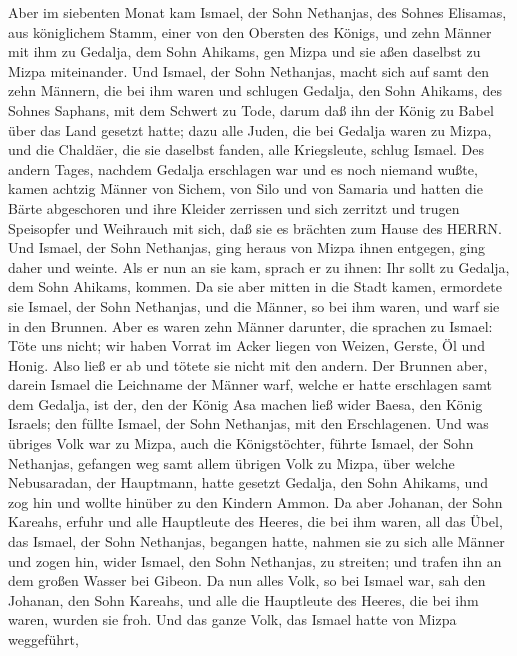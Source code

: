  Aber im siebenten Monat kam Ismael, der Sohn Nethanjas, des
Sohnes Elisamas, aus königlichem Stamm, einer von den Obersten des
Königs, und zehn Männer mit ihm zu Gedalja, dem Sohn Ahikams, gen Mizpa
und sie aßen daselbst zu Mizpa miteinander.  Und Ismael, der
Sohn Nethanjas, macht sich auf samt den zehn Männern, die bei ihm waren
und schlugen Gedalja, den Sohn Ahikams, des Sohnes Saphans, mit dem
Schwert zu Tode, darum daß ihn der König zu Babel über das Land gesetzt
hatte;  dazu alle Juden, die bei Gedalja waren zu Mizpa, und
die Chaldäer, die sie daselbst fanden, alle Kriegsleute, schlug Ismael.
 Des andern Tages, nachdem Gedalja erschlagen war und es
noch niemand wußte,  kamen achtzig Männer von Sichem, von
Silo und von Samaria und hatten die Bärte abgeschoren und ihre Kleider
zerrissen und sich zerritzt und trugen Speisopfer und Weihrauch mit
sich, daß sie es brächten zum Hause des HERRN.  Und Ismael,
der Sohn Nethanjas, ging heraus von Mizpa ihnen entgegen, ging daher und
weinte. Als er nun an sie kam, sprach er zu ihnen: Ihr sollt zu Gedalja,
dem Sohn Ahikams, kommen.  Da sie aber mitten in die Stadt
kamen, ermordete sie Ismael, der Sohn Nethanjas, und die Männer, so bei
ihm waren, und warf sie in den Brunnen.  Aber es waren zehn
Männer darunter, die sprachen zu Ismael: Töte uns nicht; wir haben
Vorrat im Acker liegen von Weizen, Gerste, Öl und Honig. Also ließ er ab
und tötete sie nicht mit den andern.  Der Brunnen aber,
darein Ismael die Leichname der Männer warf, welche er hatte erschlagen
samt dem Gedalja, ist der, den der König Asa machen ließ wider Baesa,
den König Israels; den füllte Ismael, der Sohn Nethanjas, mit den
Erschlagenen.  Und was übriges Volk war zu Mizpa, auch die
Königstöchter, führte Ismael, der Sohn Nethanjas, gefangen weg samt
allem übrigen Volk zu Mizpa, über welche Nebusaradan, der Hauptmann,
hatte gesetzt Gedalja, den Sohn Ahikams, und zog hin und wollte hinüber
zu den Kindern Ammon.  Da aber Johanan, der Sohn Kareahs,
erfuhr und alle Hauptleute des Heeres, die bei ihm waren, all das Übel,
das Ismael, der Sohn Nethanjas, begangen hatte,  nahmen sie
zu sich alle Männer und zogen hin, wider Ismael, den Sohn Nethanjas, zu
streiten; und trafen ihn an dem großen Wasser bei Gibeon. 
Da nun alles Volk, so bei Ismael war, sah den Johanan, den Sohn Kareahs,
und alle die Hauptleute des Heeres, die bei ihm waren, wurden sie froh.
 Und das ganze Volk, das Ismael hatte von Mizpa weggeführt,
